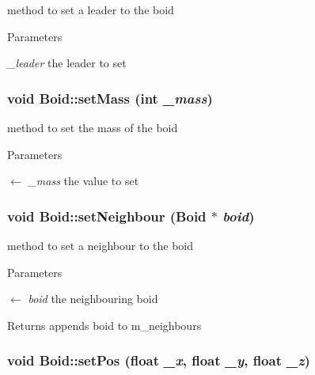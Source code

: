 method to set a leader to the boid 
\begin{DoxyParams}{Parameters}
\item[{\em \_\-leader}]the leader to set \end{DoxyParams}
\hypertarget{classBoid_af9cc5ca3786b7a0c5fa7c6b61d257bde}{
\subsubsection[{setMass}]{\setlength{\rightskip}{0pt plus 5cm}void Boid::setMass (int {\em \_\-mass})}}
\label{classBoid_af9cc5ca3786b7a0c5fa7c6b61d257bde}


method to set the mass of the boid 
\begin{DoxyParams}{Parameters}
\item[\mbox{$\leftarrow$} {\em \_\-mass}]the value to set \end{DoxyParams}
\hypertarget{classBoid_a97552481a8c6f43e203d0bc2df083830}{
\subsubsection[{setNeighbour}]{\setlength{\rightskip}{0pt plus 5cm}void Boid::setNeighbour ({\bf Boid} $\ast$ {\em boid})}}
\label{classBoid_a97552481a8c6f43e203d0bc2df083830}


method to set a neighbour to the boid 
\begin{DoxyParams}{Parameters}
\item[\mbox{$\leftarrow$} {\em boid}]the neighbouring boid \end{DoxyParams}
\begin{DoxyReturn}{Returns}
appends boid to m\_\-neighbours 
\end{DoxyReturn}
\hypertarget{classBoid_a38026ec733e0e7e705127e3f88f69b99}{
\subsubsection[{setPos}]{\setlength{\rightskip}{0pt plus 5cm}void Boid::setPos (float {\em \_\-x}, \/  float {\em \_\-y}, \/  float {\em \_\-z})}}
\label{classBoid_a38026ec733e0e7e705127e3f88f69b99}



